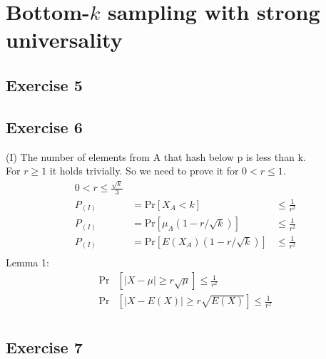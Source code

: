 \section{Bottom-$k$ sampling with strong universality}
\subsection{Exercise 5}

\subsection{Exercise 6}

(I) The number of elements from A that hash below p is less than k.\\
For $r \geq 1$ it holds trivially. So we need to prove it for $0 < r \leq 1$.
\begin{align*}
  0 < r \leq \frac{\sqrt{k}}{3}\\
  P_{(I)} &= \text{Pr}\left[ X_A < k \right] &\leq \frac{1}{r^2} \\
  P_{(I)} &= \text{Pr}\left[ \mu_A(1-r/\sqrt{k}) \right] &\leq \frac{1}{r^2} \\
  P_{(I)} &= \text{Pr}\left[ E(X_A)(1-r/\sqrt{k}) \right] &\leq \frac{1}{r^2} \\
\end{align*}
Lemma 1:
\begin{align*}
  \text{Pr}&\left[ |X - \mu| \geq r\sqrt{\mu} \right] \leq \frac{1}{r^2} \\
  \text{Pr}&\left[ |X - E(X)| \geq r\sqrt{E(X)} \right] \leq \frac{1}{r^2} \\
\end{align*}


\subsection{Exercise 7}

